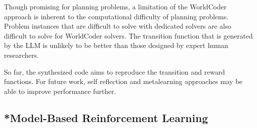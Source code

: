 Though promising for planning problems, a limitation of the WorldCoder approach is inherent to the computational difficulty of planning problems. Problem instances that are difficult to solve with dedicated solvers are also difficult to solve for WorldCoder solvers. The transition function that is generated by the LLM is unlikely to be better than those designed by expert human researchers. %

So far, the synthesized  code aims to reproduce the transition and reward functions. For future work, self reflection and metalearning approaches may be able to improve performance further.



\subsection{*Model-Based Reinforcement Learning}\label{sec:mbrl}




